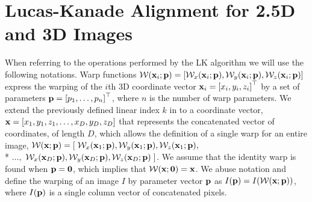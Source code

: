 \section{Lucas-Kanade Alignment for 2.5D and 3D Images}\label{sec:singl_imag_lk}
When referring to the operations performed by the LK algorithm we will use the
following notations. Warp functions
$\mathcal{W}(\boldsymbol{\mathbf{x}}_i;\boldsymbol{\mathbf{p}}) = \left[\mathcal{W}_x(\boldsymbol{\mathbf{x}}_i;\boldsymbol{\mathbf{p}}), \mathcal{W}_y(\boldsymbol{\mathbf{x}}_i;\boldsymbol{\mathbf{p}}),\mathcal{W}_z(\boldsymbol{\mathbf{x}}_i;\boldsymbol{\mathbf{p}}) \right]$ 
express the warping of the $i$th 3D
coordinate vector $\boldsymbol{\mathbf{x}}_i = {[x_i, y_i, z_i]}^{\top}$ by a set of parameters
$\boldsymbol{\mathbf{p}} = {\left[p_1, \ldots, p_n\right]}^{\top}$, where $n$ is the number of warp
parameters. We extend the previously defined linear index $k$ in to a coordinate
vector, $\boldsymbol{\mathbf{x}} = \left[ x_1, y_1, z_1, \ldots, x_D, y_D, z_D \right]$ that
represents the concatenated vector of coordinates, of length $D$, which allows
the definition of a single warp for an entire image,
$\mathcal{W}(\boldsymbol{\mathbf{x}};\boldsymbol{\mathbf{p}}) = \left[\right. \mathcal{W}_x(\boldsymbol{\mathbf{x}}_1;\boldsymbol{\mathbf{p}}), \mathcal{W}_y(\boldsymbol{\mathbf{x}}_1;\boldsymbol{\mathbf{p}}), \mathcal{W}_z(\boldsymbol{\mathbf{x}}_1;\boldsymbol{\mathbf{p}}),$ \\* $\ldots,$ $\mathcal{W}_x(\boldsymbol{\mathbf{x}}_D;\boldsymbol{\mathbf{p}}), \mathcal{W}_y(\boldsymbol{\mathbf{x}}_D;\boldsymbol{\mathbf{p}}), \mathcal{W}_z(\boldsymbol{\mathbf{x}}_D;\boldsymbol{\mathbf{p}}) \left.\right]$.
We assume that the identity warp is found when $\boldsymbol{\mathbf{p}} = \boldsymbol{\mathbf{0}}$, which implies that
$\mathcal{W}(\boldsymbol{\mathbf{x}};\boldsymbol{\mathbf{0}}) = \boldsymbol{\mathbf{x}}$. We abuse notation and define the
warping of an image $I$ by parameter vector $\boldsymbol{\mathbf{p}}$ as $I(\boldsymbol{\mathbf{p}}) = I(\mathcal{W}(\boldsymbol{\mathbf{x}};\boldsymbol{\mathbf{p}}))$,
where $I(\boldsymbol{\mathbf{p}})$ is a single column vector of concatenated pixels.

